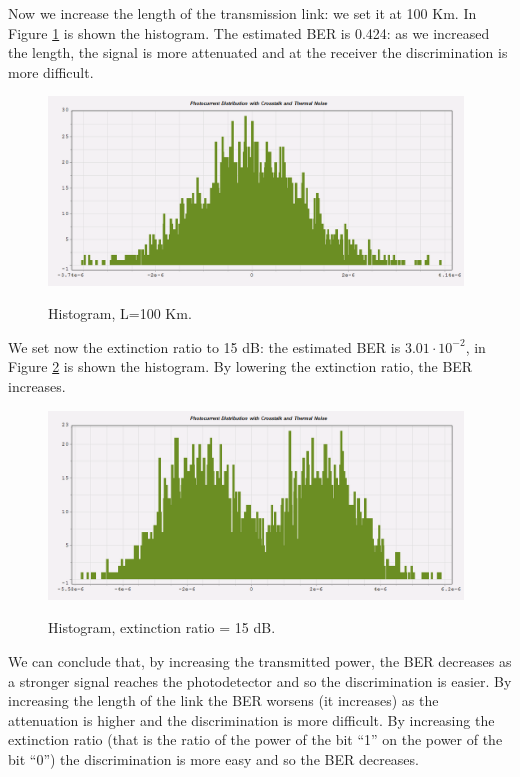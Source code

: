 \documentclass[a4paper,10pt]{report}
\begin{document}
Now we increase the length of the transmission link: we set it at 100 Km.
In Figure \ref{ex3_2} is shown the histogram. The estimated BER is 0.424: as we increased the length, the signal is more attenuated
and at the receiver the discrimination is more difficult.

\begin{figure}[!ht]
   \centering
   \includegraphics[width=11cm]{ex3_2.png}\\
   \caption{Histogram, L=100 Km.}
   \label{ex3_2}
\end{figure}

We set now the extinction ratio to 15 dB: the estimated BER is $3.01 \cdot 10^{-2}$, in Figure \ref{ex3_3} is shown the histogram.
By lowering the extinction ratio, the BER increases.

\begin{figure}[!ht]
   \centering
   \includegraphics[width=11cm]{ex3_3.png}\\
   \caption{Histogram, extinction ratio = 15 dB.}
   \label{ex3_3}
\end{figure}

We can conclude that, by increasing the transmitted power, the BER decreases as a stronger signal reaches the photodetector and
so the discrimination is easier.
By increasing the length of the link the BER worsens (it increases) as the attenuation is higher and the discrimination is more difficult.
By increasing the extinction ratio (that is the ratio of the power of the bit ``1'' on the power of the bit ``0'')
the discrimination is more easy and so the BER decreases.
\end{document}
